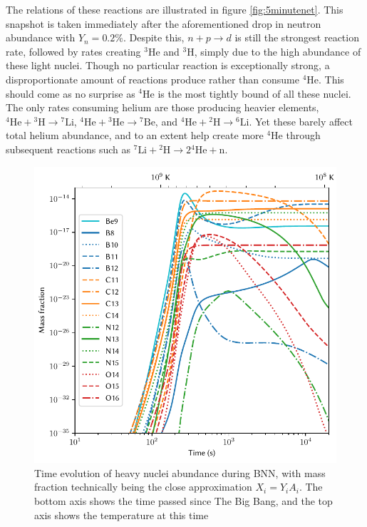 The relations of these reactions are illustrated in figure \ref{fig:5minutenet}. This snapshot is taken immediately after the aforementioned drop in neutron abundance with $Y_n=0.2\%$. Despite this, $n+p\rightarrow d$ is still the strongest reaction rate, followed by rates creating ${}^3$He and ${}^3$H, simply due to the high abundance of these light nuclei. Though no particular reaction is exceptionally strong, a disproportionate amount of reactions produce rather than consume ${}^4$He. This should come as no surprise as ${}^4$He is the most tightly bound of all these nuclei. The only rates consuming helium are those producing heavier elements, ${}^4\text{He}+{}^3\text{H}\rightarrow {}^7\text{Li}$, ${}^4\text{He}+{}^3\text{He}\rightarrow {}^7\text{Be}$, and ${}^4\text{He}+{}^2\text{H}\rightarrow {}^6\text{Li}$. Yet these barely affect total helium abundance, and to an extent help create more ${}^4$He through subsequent reactions such as ${}^7\text{Li}+{}^2\text{H}\rightarrow 2 {}^4\text{He}+\text{n}$. 


\begin{figure}[ht]
    \includegraphics[width=5.1in]{figures/abundanceheavy.pdf}
    \caption{Time evolution of heavy nuclei abundance during BNN, with mass fraction technically being the close approximation $X_i=Y_i A_i$. The bottom axis shows the time passed since The Big Bang, and the top axis shows the temperature at this time}
    \label{fig:heavyXevo}
\end{figure}

